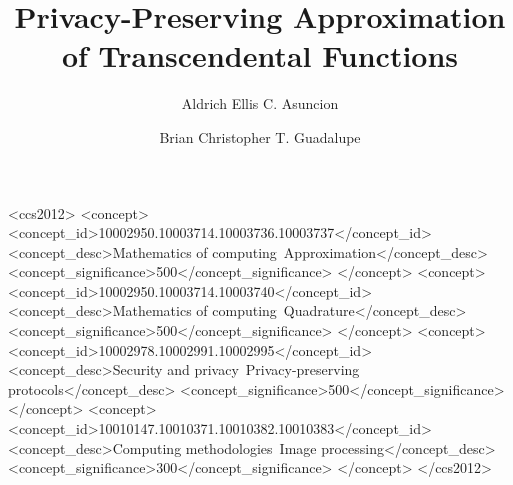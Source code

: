 \documentclass[sigconf]{acmart}
\begin{document}
\title{Privacy-Preserving Approximation of Transcendental Functions}

\author{Aldrich Ellis C. Asuncion}

\author{Brian Christopher T. Guadalupe}


\begin{abstract}

\end{abstract}

%
%
\begin{CCSXML}
  <ccs2012>
  <concept>
  <concept_id>10002950.10003714.10003736.10003737</concept_id>
  <concept_desc>Mathematics of computing~Approximation</concept_desc>
  <concept_significance>500</concept_significance>
  </concept>
  <concept>
  <concept_id>10002950.10003714.10003740</concept_id>
  <concept_desc>Mathematics of computing~Quadrature</concept_desc>
  <concept_significance>500</concept_significance>
  </concept>
  <concept>
  <concept_id>10002978.10002991.10002995</concept_id>
  <concept_desc>Security and privacy~Privacy-preserving protocols</concept_desc>
  <concept_significance>500</concept_significance>
  </concept>
  <concept>
  <concept_id>10010147.10010371.10010382.10010383</concept_id>
  <concept_desc>Computing methodologies~Image processing</concept_desc>
  <concept_significance>300</concept_significance>
  </concept>
  </ccs2012>
\end{CCSXML}
\end{document}
